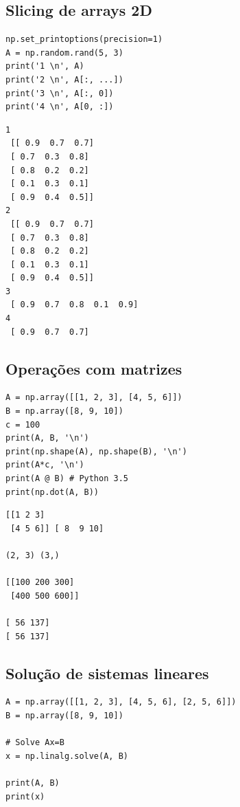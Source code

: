 \documentclass[presentation]{beamer}
\begin{document}
\subsection{Slicing de arrays 2D}
\label{sec:orgheadline11}

\begin{verbatim}
np.set_printoptions(precision=1)
A = np.random.rand(5, 3)
print('1 \n', A)
print('2 \n', A[:, ...])
print('3 \n', A[:, 0])
print('4 \n', A[0, :])
\end{verbatim}

\begin{verbatim}
1 
 [[ 0.9  0.7  0.7]
 [ 0.7  0.3  0.8]
 [ 0.8  0.2  0.2]
 [ 0.1  0.3  0.1]
 [ 0.9  0.4  0.5]]
2 
 [[ 0.9  0.7  0.7]
 [ 0.7  0.3  0.8]
 [ 0.8  0.2  0.2]
 [ 0.1  0.3  0.1]
 [ 0.9  0.4  0.5]]
3 
 [ 0.9  0.7  0.8  0.1  0.9]
4 
 [ 0.9  0.7  0.7]
\end{verbatim}





\subsection{Operações com matrizes}
\label{sec:orgheadline12}

\begin{verbatim}
A = np.array([[1, 2, 3], [4, 5, 6]])
B = np.array([8, 9, 10])
c = 100
print(A, B, '\n')
print(np.shape(A), np.shape(B), '\n')
print(A*c, '\n')
print(A @ B) # Python 3.5
print(np.dot(A, B))
\end{verbatim}

\begin{verbatim}
[[1 2 3]
 [4 5 6]] [ 8  9 10] 

(2, 3) (3,) 

[[100 200 300]
 [400 500 600]] 

[ 56 137]
[ 56 137]
\end{verbatim}

\subsection{Solução de sistemas lineares}
\label{sec:orgheadline13}


\begin{verbatim}
A = np.array([[1, 2, 3], [4, 5, 6], [2, 5, 6]])
B = np.array([8, 9, 10])

# Solve Ax=B
x = np.linalg.solve(A, B)

print(A, B)
print(x)
\end{verbatim}
\end{document}
